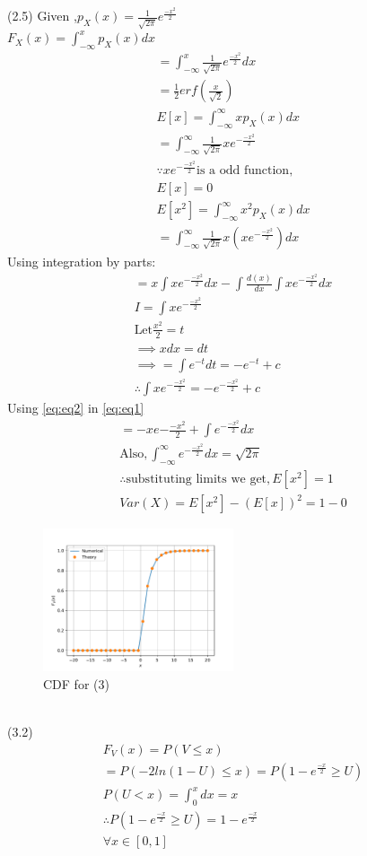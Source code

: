 \documentclass[journal,12pt,twocolumn]{IEEEtran}
\begin{document}
(2.5) Given ,$p_{X}(x)=\frac{1}{\sqrt{2\pi}} e^{\frac{-x^2}{2}}$\\
 $F_{X}(x)=\int_{-\infty}^{x} p_{X}(x) dx$\\
 \begin{align}
  =\int_{-\infty}^{x} \frac{1}{\sqrt{2\pi}} e^{\frac{-x^2}{2}} dx\\
 =\frac{1}{2} erf\left(\frac{x}{\sqrt{2}}\right)\\
 E[x]=\int_{-\infty}^{\infty} x p_{X}(x) dx\\
 =\int_{-\infty}^{\infty} \frac{1}{\sqrt{2 \pi}} x e^{-\frac{-x^2}{2}}\\
  \because x e^{-\frac{-x^2}{2}} \text{is a odd function},\\
  \nonumber
   E[x]=0\\
 E[x^2]=\int_{-\infty}^{\infty} x^2 p_{X}(x) dx\\
 =\int_{-\infty}^{\infty} \frac{1}{\sqrt{2\pi}} x(xe^{-\frac{-x^2}{2}}) dx
 \end{align}
  Using integration by parts:
  \begin{align}
   \label{eq:eq1}
  =x\int xe^{-\frac{-x^2}{2}} dx-\int\frac{d(x)}{dx} \int xe^{-\frac{-x^2}{2}}dx\\
 I=\int x e^{-\frac{-x^2}{2}}\\
 \text{Let} \frac{x^2}{2}=t \\
 \implies x dx=dt\\
 \implies =\int e^{-t} dt=-e^{-t} +c\\
 \label{eq:eq2}
 \therefore \int x e^{-\frac{-x^2}{2}}=-e^{-\frac{-x^2}{2}} +c
 \end{align}
 Using \eqref{eq:eq2} in \eqref{eq:eq1}\\
 \begin{align}
= -x e{-\frac{-x^2}{2}}+\int e^{-\frac{-x^2}{2}} dx\\
\text{Also} ,\int_{-\infty}^{\infty} e^{-\frac{-x^2}{2}} dx=\sqrt{2 \pi} \\
\therefore \text{substituting limits we get}, E[x^2]=1\\
 Var(X)=E[x^2]-(E[x])^2=1-0
 \end{align}
 \begin{figure}[h]
\includegraphics[width=0.5\textwidth]{V_cdf.pdf}
\caption{CDF for (3)}
\label{fig:my_label}
\end{figure}
\\
 (3.2)\begin{align}
 F_{V}(x)=P(V \leq x)\\
 =P(-2 ln(1-U) \leq x)=P(1-e^{\frac{-x}{2}} \geq U)\\
 P(U<x)=\int_{0}^{x} dx=x\\
 \therefore P(1-e^{\frac{-x}{2}} \geq U)=1-e^{\frac{-x}{2}} \\ 
 \nonumber
 \forall x\in [0,1]
 \end{align}
\end{document}

